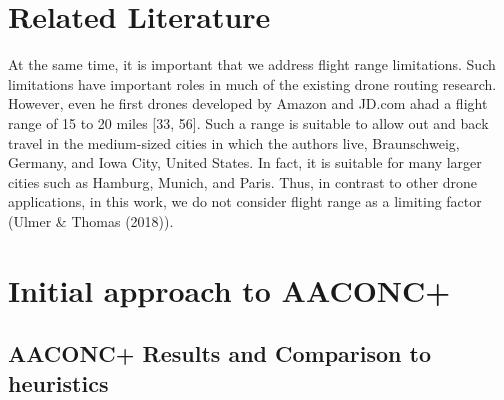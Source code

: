 \documentclass{article}
\begin{document}
	
	\twocolumn
	
	\section{Related Literature}
	
	At the same time, it is important that we address flight range limitations. Such limitations have important roles in much of
	the existing drone routing research. However, even he first drones developed by Amazon and JD.com ahad a flight range of 15
	to 20 miles [33, 56]. Such a range is suitable to allow out and back travel in the medium-sized cities in which the authors live,
	Braunschweig, Germany, and Iowa City, United States. In fact, it is suitable for many larger cities such as Hamburg, Munich,
	and Paris. Thus, in contrast to other drone applications, in this work, we do not consider flight range as a limiting factor (Ulmer \& Thomas (2018)).
	
	\clearpage
	\section{Initial approach to AACONC+}
	\;
	\;
	\;
	\newpage
	\subsection{AACONC+ Results and Comparison to heuristics}
	\;
	\;
	\captionsetup{justification=centering}  %


	
\end{document}
